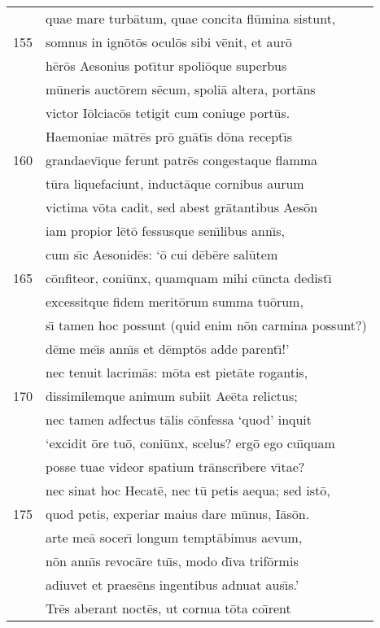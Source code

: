\documentclass[paper=6in:9in,pagesize=pdftex,
               headinclude=on,footinclude=on,12pt]{scrbook}
\begin{document}
\begin{longtable}[p]{ r l }
 & quae mare turb\=atum, quae concita fl\=umina sistunt,\\ 
155 & somnus in ign\=ot\=os ocul\=os sibi v\=enit, et aur\=o\\ 
 & h\=er\=os Aesonius pot\={\i}tur spoli\=oque superbus\\ 
 & m\=uneris auct\=orem s\=ecum, spoli\=a altera, port\=ans\\ 
 & victor I\=olciac\=os tetigit cum coniuge port\=us.\\ 
 & \indent Haemoniae m\=atr\=es pr\=o gn\=at\={\i}s d\=ona recept\={\i}s\\ 
160 & grandaev\={\i}que ferunt patr\=es congestaque flamma\\ 
 & t\=ura liquefaciunt, induct\=aque cornibus aurum\\ 
 & victima v\=ota cadit, sed abest gr\=atantibus Aes\=on\\ 
 & iam propior l\=et\=o fessusque sen\={\i}libus ann\={\i}s,\\ 
 & cum s\={\i}c Aesonid\=es: `\=o cui d\=eb\=ere sal\=utem\\ 
165 & c\=onfiteor, coni\=unx, quamquam mihi c\=uncta dedist\={\i}\\ 
 & excessitque fidem merit\=orum summa tu\=orum,\\ 
 & s\={\i} tamen hoc possunt (quid enim n\=on carmina possunt?)\\ 
 & d\=eme me\={\i}s ann\={\i}s et d\=empt\=os adde parent\={\i}!'\\ 
 & nec tenuit lacrim\=as: m\=ota est piet\=ate rogantis,\\ 
170 & dissimilemque animum subiit Ae\=eta relictus;\\ 
 & nec tamen adfectus t\=alis c\=onfessa `quod' inquit\\ 
 & `excidit \=ore tu\=o, coni\=unx, scelus? erg\=o ego cu\={\i}quam\\ 
 & posse tuae videor spatium tr\=anscr\={\i}bere v\={\i}tae?\\ 
 & nec sinat hoc Hecat\=e, nec t\=u petis aequa; sed ist\=o,\\ 
175 & quod petis, experiar maius dare m\=unus, I\=as\=on.\\ 
 & arte me\=a socer\={\i} longum tempt\=abimus aevum,\\ 
 & n\=on ann\={\i}s revoc\=are tu\={\i}s, modo d\={\i}va trif\=ormis\\ 
 & adiuvet et praes\=ens ingentibus adnuat aus\={\i}s.'\\ 
 & \indent Tr\=es aberant noct\=es, ut cornua t\=ota co\={\i}rent\\ 

\end{longtable}
\end{document}
